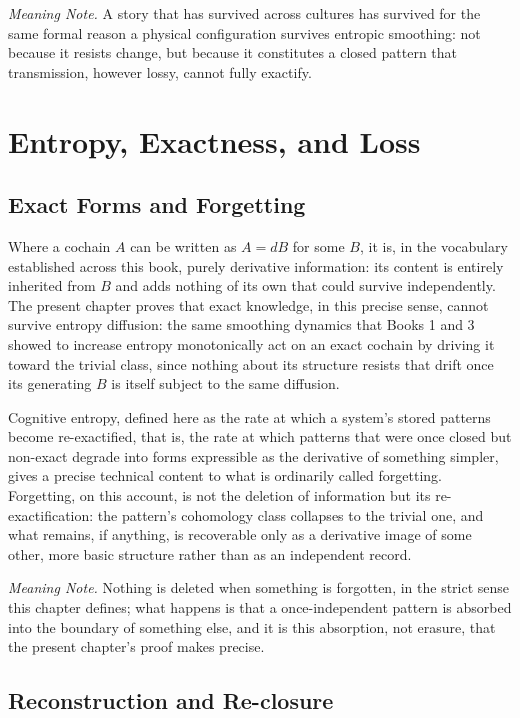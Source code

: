 \emph{Meaning Note.} A story that has survived across cultures has survived for the same formal reason a physical configuration survives entropic smoothing: not because it resists change, but because it constitutes a closed pattern that transmission, however lossy, cannot fully exactify.

\part{Entropy, Exactness, and Loss}

\chapter{Exact Forms and Forgetting}

Where a cochain $A$ can be written as $A = dB$ for some $B$, it is, in the vocabulary established across this book, purely derivative information: its content is entirely inherited from $B$ and adds nothing of its own that could survive independently. The present chapter proves that exact knowledge, in this precise sense, cannot survive entropy diffusion: the same smoothing dynamics that Books 1 and 3 showed to increase entropy monotonically act on an exact cochain by driving it toward the trivial class, since nothing about its structure resists that drift once its generating $B$ is itself subject to the same diffusion.

Cognitive entropy, defined here as the rate at which a system's stored patterns become re-exactified, that is, the rate at which patterns that were once closed but non-exact degrade into forms expressible as the derivative of something simpler, gives a precise technical content to what is ordinarily called forgetting. Forgetting, on this account, is not the deletion of information but its re-exactification: the pattern's cohomology class collapses to the trivial one, and what remains, if anything, is recoverable only as a derivative image of some other, more basic structure rather than as an independent record.

\emph{Meaning Note.} Nothing is deleted when something is forgotten, in the strict sense this chapter defines; what happens is that a once-independent pattern is absorbed into the boundary of something else, and it is this absorption, not erasure, that the present chapter's proof makes precise.

\chapter{Reconstruction and Re-closure}

